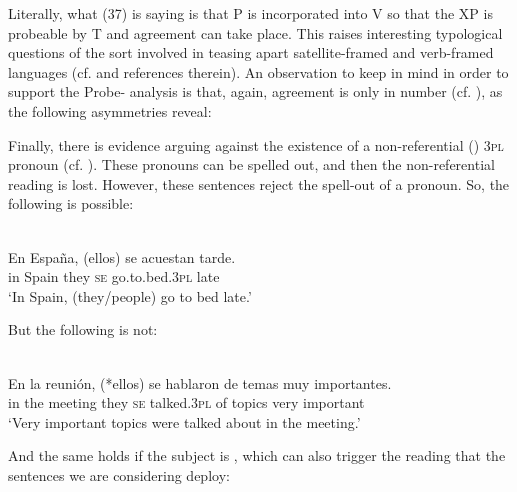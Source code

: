\documentclass[output=paper]{langsci/langscibook}
\begin{document}

Literally, what (37) is saying is that P is incorporated into V so that the XP  is probeable by T and agreement can take place. This raises interesting typological questions of the sort involved in teasing apart satellite-framed and verb-framed languages (cf. \citealt{Mateu2012} and references therein). An observation to keep in mind in order to support the Probe- analysis is that, again, agreement is only in number (cf. \citealt{Etxepare2006}), as the following asymmetries reveal:



    \z
    
Finally, there is evidence arguing against the existence of a non-referential () \textsc{3pl} pronoun (cf. \citealt{Suñer1983,Cabredo2003}). These pronouns can be spelled out, and then the non-referential reading is lost. However, these sentences reject the spell-out of a pronoun. So, the following is possible:

\ea%
    \label{ex:gallego:39}\\
    \gll En España, (ellos)  se  acuestan            tarde.    \\
         in  Spain       they   \textsc{se} go.to.bed.\textsc{3pl}   late\\
    \glt ‘In Spain, (they/people) go to bed late.’
    \z

But the following is not:

\ea%
    \label{ex:gallego:40}\\
    \gll En la   reunión, (*ellos)  se   hablaron     de  temas muy importantes.  \\
         in  the  meeting   they   \textsc{se} talked.\textsc{3pl}  of  topics very important\\
    \glt ‘Very important topics were talked about in the meeting.’
    \z

And the same holds if the subject is , which can also trigger the  reading that the sentences we are considering deploy:
\end{document}
